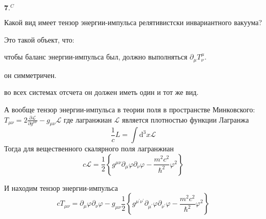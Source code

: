 \documentclass[a4paper,12pt]{article} %
\begin{document}
\begin{ttask} $\mathbf{7} .^{C}$ 

Какой вид имеет тензор энергии-импульса релятивистски инвариантного вакуума?


Это такой объект, что:

чтобы баланс энергии-импульса был, должно выполняться
$ \partial_\mu T^\mu_\nu.$


он симметричен.

во всех системах отсчета он должен иметь один и тот же вид.



А вообще тензор энергии-импульса в теории поля в пространстве Минковского:
$T_{\mu \nu}=2 \frac{\partial \mathcal{L}}{\partial g^{\mu \nu}}-g_{\mu \nu} \mathcal{L}$
где лагранжиан $\mathcal{L}$ является плотностью функции Лагранжа
$$
\frac{1}{c} L=\int \mathrm{d}^{3} x \mathcal{L}
$$
Тогда для вещественного скалярного поля лагранжиан
$$
c \mathcal{L}
=
\frac{1}{2}\left\{
g^{\mu \nu} \partial_{\mu} \varphi \partial_{\nu} \varphi
-
\frac{m^{2} c^{2}}{\hbar^{2}} \varphi^{2}
\right\}
$$


И находим тензор энергии-импульса
$$
c T_{\mu \nu}
=
\partial_{\mu} \varphi \partial_{\nu} \varphi-g_{\mu \nu} \frac{1}{2}\left\{g^{\mu^{\prime} \nu^{\prime}} \partial_{\mu^{\prime}} \varphi \partial_{\nu^{\prime}} \varphi-\frac{m^{2} c^{2}}{\hbar^{2}} \varphi^{2}\right\}
$$











\end{ttask}
\end{document}
